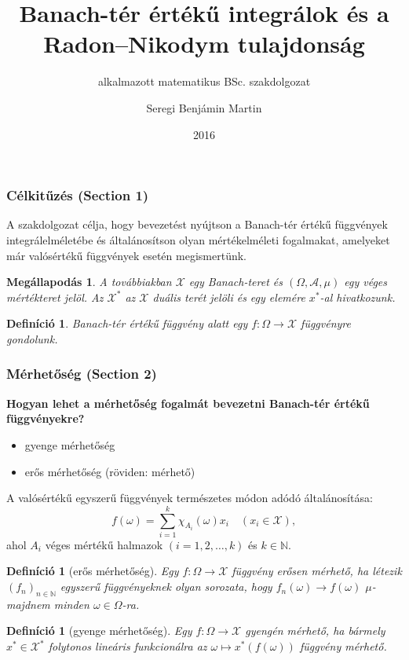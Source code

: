 \documentclass[handout]{beamer} %
\title{Banach-tér értékű integrálok és a Radon\---Nikodym tulajdonság}
\subtitle{alkalmazott matematikus BSc. szakdolgozat}
\author{Seregi Benjámin Martin}
\institute{Eötvös Loránd Tudományegyetem}
\date{2016}
\newtheorem{defi}[lem]{Definíció}
\newtheorem{megall}[lem]{Megállapodás}
\begin{document}
\frame{\titlepage}
\begin{frame}
\frametitle{Célkitűzés (Section 1)}
\justifying
A szakdolgozat célja, hogy bevezetést nyújtson a Banach-tér értékű függvények integrálelméletébe és általánosítson olyan mértékelméleti fogalmakat, amelyeket már valósértékű függvények esetén megismertünk.
\begin{megall}
A továbbiakban $\mathcal{X}$ egy Banach-teret és $(\Omega, \mathcal{A}, \mu)$ egy véges mértékteret jelöl. Az $\mathcal{X}^*$ az $\mathcal{X}$ duális terét jelöli és egy elemére $x^*$-al hivatkozunk.
\end{megall}
\begin{defi}
Banach-tér értékű függvény alatt egy  $f \colon \Omega \to \mathcal{X}$ függvényre gondolunk.
\end{defi}
\end{frame}

\begin{frame}
\frametitle{Mérhetőség (Section 2)}
\justifying
\textbf{Hogyan lehet a mérhetőség fogalmát bevezetni Banach-tér értékű függvényekre?}
\begin{itemize}
\item gyenge mérhetőség
\item erős mérhetőség (röviden: mérhető)
\end{itemize}
\end{frame}

\begin{frame}
A valósértékű egyszerű függvények természetes módon adódó általánosítása:
$$f(\omega) = \sum^k_{i=1} \chi_{A_i}(\omega)x_i \quad (x_i \in \mathcal{X}),$$
ahol $A_i$ véges mértékű halmazok $(i=1,2,\ldots,k)$ és $k \in \mathbb{N}$.
\begin{defi}[erős mérhetőség] Egy $f \colon \Omega \to \mathcal{X}$ függvény erősen mérhető, ha létezik $(f_n)_{n \in \mathbb{N}}$ egyszerű függvényeknek olyan sorozata, hogy $f_n(\omega) \to f(\omega)$ $\mu$-majdnem minden $\omega \in \Omega$-ra.
\end{defi}
\begin{defi}[gyenge mérhetőség] Egy $f \colon \Omega \to \mathcal{X}$ gyengén mérhető, ha bármely $x^* \in \mathcal{X}^*$ folytonos lineáris funkcionálra az $\omega \mapsto x^*(f(\omega))$ függvény mérhető.
\end{defi}
\end{frame}
\end{document}
